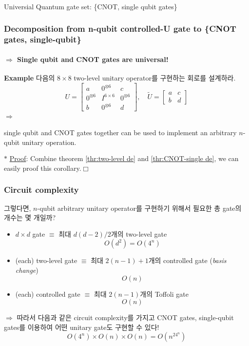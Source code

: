 \documentclass[9pt]{beamer}
\begin{document}
\begin{section}{Universial Quantum gate set: \{CNOT, single qubit gates\}}
        \begin{frame}
            \frametitle{Decomposition from n-qubit controlled-U gate to \{CNOT gates, single-qubit\}}
            \framesubtitle{$\Rightarrow$ Single qubit and CNOT gates are universal!}
            \textbf{Example} 다음의 $8\times 8$ two-level unitary operator를 구현하는 회로를 설계하라.
            $$ U=\left[\begin{array}{llllllll}
                a &  0^{\otimes 6} & c \\
                0^{\otimes 6}  & I^{6\times 6} & 0^{\otimes 6}  \\
                b & 0^{\otimes 6}  & d
                \end{array}\right], \quad \tilde{U} = \begin{bmatrix} a & c \\ b & d\end{bmatrix}$$
            $\Rightarrow$
                \vspace{2.6cm}
            \begin{corollary}\label{col:universial-ver1}
                single qubit and CNOT gates together can be used to implement an \alert{arbitrary $n$-qubit unitary operation}.
            \end{corollary}
            $\ast$ \underline{Proof}: Combine theorem \ref{thr:two-level de} and \ref{thr:CNOT-single de}, we can easily proof this corollary.$\Box$
        \end{frame}

        \begin{frame}
            \frametitle{Circuit complexity}
            그렇다면, $n$-qubit arbitrary unitary operator를 구현하기 위해서 필요한 총 gate의 개수는 몇 개일까?
            \begin{itemize}
                \item $d\times d$ gate $\equiv$ 최대 $d(d-2)/2$개의 two-level gate
                $$O(d^2) = O(4^n)$$
                \item (each) two-level gate $\equiv$ 최대 $2(n-1) + 1$개의 controlled gate (\textit{basis change})
                $$O(n)$$
                \item (each) controlled gate $\equiv$ 최대 $2(n-1)$개의 Toffoli gate
                $$O(n)$$
            \end{itemize}
            $\Rightarrow$ 따라서 다음과 같은 circuit complexity를 가지고 CNOT gates, single-qubit gates를 이용하여 어떤 unitary gate도 구현할 수 있다!
            $$ O(4^n) \times O(n) \times O(n) = O(n^24^n)$$
            

\end{frame}
\end{section}
\end{document}
